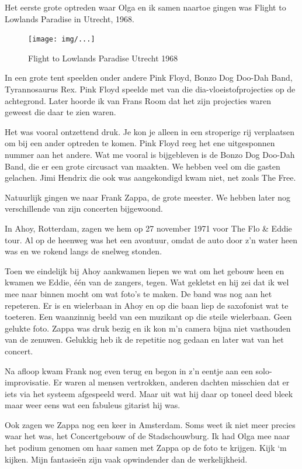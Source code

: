 \documentclass[12pt,twoside]{memoir}
\begin{document}
Het eerste grote optreden waar Olga en ik samen naartoe gingen was Flight to Lowlands Paradise in Utrecht, 1968.

\begin{figure}[t]
\texttt{[image: img/...]}
\caption{Flight to Lowlands Paradise Utrecht 1968}
\end{figure}

In een grote tent speelden onder andere Pink Floyd, Bonzo Dog Doo-Dah Band, Tyrannosaurus Rex. Pink Floyd speelde met van die dia-vloeistofprojecties op de achtegrond. Later hoorde ik van Frans Room dat het zijn projecties waren geweest die daar te zien waren.

Het was vooral ontzettend druk. Je kon je alleen in een stroperige rij verplaatsen om bij een ander optreden te komen. 
Pink Floyd reeg het ene uitgesponnen nummer aan het andere. Wat me vooral is bijgebleven is de Bonzo Dog Doo-Dah Band, die er een grote circusact van maakten. We hebben veel om die gasten gelachen. Jimi Hendrix die ook was aangekondigd kwam niet, net zoals The Free.

Natuurlijk gingen we naar Frank Zappa, de grote meester. We hebben later nog verschillende van zijn concerten bijgewoond.

In Ahoy, Rotterdam, zagen we hem op 27 november 1971 voor The Flo & Eddie tour. Al op de heenweg was het een avontuur, omdat de auto door z’n water heen was en we rokend langs de snelweg stonden. 

Toen we eindelijk bij Ahoy aankwamen liepen we wat om het gebouw heen en kwamen we Eddie, één van de zangers, tegen. Wat gekletst en hij zei dat ik wel mee naar binnen mocht om wat foto's te maken. De band was nog aan het repeteren. Er is en wielerbaan in Ahoy en op die baan liep de saxofonist wat te toeteren. Een waanzinnig beeld van een muzikant op die steile wielerbaan. Geen gelukte foto. Zappa was druk bezig en ik kon m’n camera bijna niet vasthouden van de zenuwen. Gelukkig heb ik de repetitie nog gedaan en later wat van het concert. 

Na afloop kwam Frank nog even terug en begon in z’n eentje aan een solo-improvisatie. Er waren al mensen vertrokken, anderen dachten misschien dat er iets via het systeem afgespeeld werd. Maar uit wat hij daar op toneel deed bleek maar weer eens wat een fabuleus gitarist hij was.

Ook zagen we Zappa nog een keer in Amsterdam. Soms weet ik niet meer precies waar het was, het Concertgebouw of de Stadschouwburg. Ik had Olga mee naar het podium genomen om haar samen met Zappa op de foto te krijgen. Kijk ‘m kijken. Mijn fantasieën zijn vaak opwindender dan de werkelijkheid.
\end{document}
